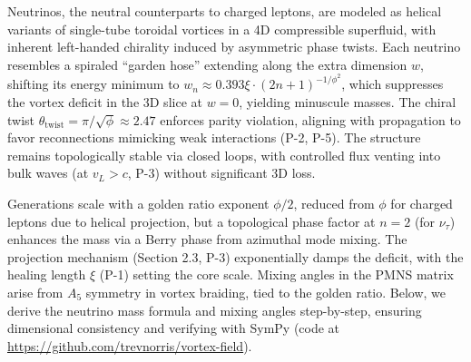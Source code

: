 Neutrinos, the neutral counterparts to charged leptons, are modeled as helical variants of single-tube toroidal vortices in a 4D compressible superfluid, with inherent left-handed chirality induced by asymmetric phase twists. Each neutrino resembles a spiraled ``garden hose'' extending along the extra dimension $w$, shifting its energy minimum to $w_n \approx 0.393 \xi \cdot (2n+1)^{-1/\phi^2}$, which suppresses the vortex deficit in the 3D slice at $w=0$, yielding minuscule masses. The chiral twist $\theta_{\text{twist}} = \pi / \sqrt{\phi} \approx 2.47$ enforces parity violation, aligning with propagation to favor reconnections mimicking weak interactions (P-2, P-5). The structure remains topologically stable via closed loops, with controlled flux venting into bulk waves (at $v_L > c$, P-3) without significant 3D loss.

Generations scale with a golden ratio exponent $\phi/2$, reduced from $\phi$ for charged leptons due to helical projection, but a topological phase factor at $n=2$ (for $\nu_\tau$) enhances the mass via a Berry phase from azimuthal mode mixing. The projection mechanism (Section 2.3, P-3) exponentially damps the deficit, with the healing length $\xi$ (P-1) setting the core scale. Mixing angles in the PMNS matrix arise from $A_5$ symmetry in vortex braiding, tied to the golden ratio. Below, we derive the neutrino mass formula and mixing angles step-by-step, ensuring dimensional consistency and verifying with SymPy (code at \url{https://github.com/trevnorris/vortex-field}).

